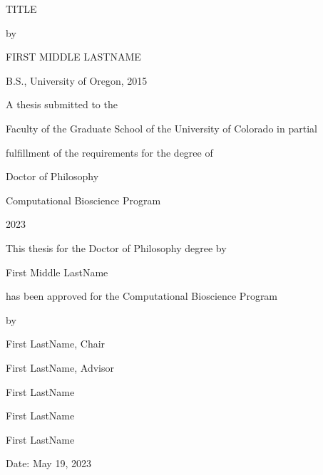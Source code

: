 \documentclass[12pt]{caltech_thesis}
\begin{document}
\DoubleSpacing
\frontmatter
\setbeforesecskip{0in}
\setbeforesubsecskip{0in}
\setbeforesubsubsecskip{0in}

\setaftersecskip{1sp}
\setaftersubsecskip{1sp}
\setaftersubsubsecskip{1sp}

\begin{center}

\thispagestyle{empty}
\vspace{.5in}
\uppercase{TITLE} 


by \par
\uppercase{First Middle LastName} \par
B.S., University of Oregon, 2015 \par
\vspace{2.5in}


A thesis submitted to the \par
Faculty of the Graduate School of the University of Colorado in partial\par fulfillment of the requirements for the degree of\par
Doctor of Philosophy\par
Computational Bioscience Program\par
2023



\end{center}

\newpage

\par\par  
\begin{center}
\vspace{2in}
This thesis for the Doctor of Philosophy degree by \par
First Middle LastName \par
has been approved for the Computational Bioscience Program \par
\vspace{1in}
by\par
\vspace{1.5in}
First LastName, Chair\par 
First LastName, Advisor\par 
First LastName \par
First LastName \par
First LastName \par
\end{center}
\vspace{.75in}
\hspace{4in}Date:  May 19, 2023 %
\end{document}
